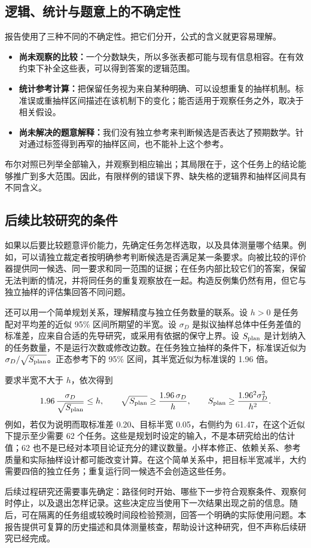 \subsection{逻辑、统计与题意上的不确定性}
\label{subsec:uncertainty}
报告使用了三种不同的不确定性。把它们分开，公式的含义就更容易理解。
\begin{itemize}[leftmargin=*]
\item \textbf{尚未观察的比较：}一个分数缺失，所以多张表都可能与现有信息相容。在有效约束下补全这些表，可以得到答案的逻辑范围。
\item \textbf{统计参考计算：}把保留任务视为来自某种明确、可以设想重复的抽样机制。标准误或重抽样区间描述在该机制下的变化；能否适用于观察任务之外，取决于相关假设。
\item \textbf{尚未解决的题意解释：}我们没有独立参考来判断候选是否表达了预期数学。针对通过标签得到再窄的抽样区间，也不能补上这个参考。
\end{itemize}
布尔对照已列举全部输入，并观察到相应输出；其局限在于，这个任务上的结论能够推广到多大范围。因此，有限样例的错误下界、缺失格的逻辑界和抽样区间具有不同含义。

\subsection{后续比较研究的条件}
\label{subsec:future-design}
如果以后要比较题意评价能力，先确定任务怎样选取，以及具体测量哪个结果。例如，可以请独立裁定者按明确参考判断候选是否满足某一条要求。向被比较的评价器提供同一候选、同一要求和同一范围的证据；在任务内部比较它们的答案，保留无法判断的情况，并将同任务的重复观察放在一起。构造反例集仍然有用，但它与独立抽样的评估集回答不同问题。

还可以用一个简单规划关系，理解精度与独立任务数量的联系。设 $h>0$ 是任务配对平均差的近似 95\% 区间所期望的半宽。设 $\sigma_D$ 是拟议抽样总体中任务差值的标准差，应来自合适的先导研究，或采用有依据的保守上界。设 $S_{\rm plan}$ 是计划纳入的任务数量，不是运行次数或修改边数。在任务独立抽样的条件下，标准误近似为 $\sigma_D/\sqrt{S_{\rm plan}}$。正态参考下的 95\% 区间，其半宽近似为标准误的 1.96 倍。

要求半宽不大于 $h$，依次得到
\[
1.96\,\frac{\sigma_D}{\sqrt{S_{\rm plan}}}\le h,
\qquad
\sqrt{S_{\rm plan}}\ge\frac{1.96\,\sigma_D}{h},
\qquad
S_{\rm plan}\ge\frac{1.96^2\sigma_D^2}{h^2}.
\]
例如，若仅为说明而取标准差 0.20、目标半宽 0.05，右侧约为 61.47，在这个近似下提示至少需要 62 个任务。这些是规划时设定的输入，不是本研究给出的估计值；62 也不是已经对本项目论证充分的建议数量。小样本修正、依赖关系、参考质量和实际抽样设计都可能改变计算。在这个简单关系中，把目标半宽减半，大约需要四倍的独立任务；重复运行同一候选不会创造这些任务。

后续过程研究还需要事先确定：路径何时开始、哪些下一步符合观察条件、观察何时停止，以及退出怎样记录。这些决定应当使用下一次结果出现之前的信息。随后，可在隔离的任务组或较晚时间段检验预测，回答一个明确的实际使用问题。本报告提供可复算的历史描述和具体测量核查，帮助设计这种研究，但不声称后续研究已经完成。
